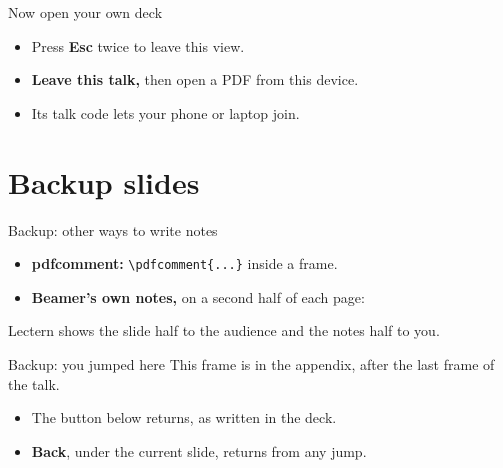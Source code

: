\documentclass[aspectratio=169,14pt]{beamer}
\newcommand{\key}[1]{\textbf{#1}}
\newcommand{\return}[2]{\hyperlink{#1}{\scalebox{1.4}{\beamerreturnbutton{#2}}}}
\begin{document}
\begin{frame}{Now open your own deck}
  \begin{itemize}
    \item Press \key{Esc} twice to leave this view.
    \item \textbf{Leave this talk,} then open a PDF from this device.
    \item Its talk code lets your phone or laptop join.
  \end{itemize}
\end{frame}

\appendix
\section{Backup slides}

\begin{frame}[fragile,label=backup-notes]{Backup: other ways to write notes}
  \begin{itemize}
    \item \textbf{pdfcomment:} \verb|\pdfcomment{...}| inside a frame.
    \item \textbf{Beamer's own notes,} on a second half of each page:
  \end{itemize}

  \medskip
  Lectern shows the slide half to the audience and the notes half to you.

  \smallskip
  \return{notes}{Back}
\end{frame}

\begin{frame}[label=backup-jump]{Backup: you jumped here}
  This frame is in the appendix, after the last frame of the talk.
  \begin{itemize}
    \item<2-> The button below returns, as written in the deck.
    \item<2-> \textbf{Back}, under the current slide, returns from any jump.
  \end{itemize}

  \bigskip
  \return{links}{Back to the links}
\end{frame}
\end{document}
